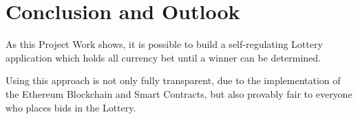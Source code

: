 \chapter{Conclusion and Outlook}\label{chap:conclusion}
\chapterstart

As this Project Work shows, it is possible to build a self-regulating Lottery application which holds all currency bet until a winner can be determined. 

Using this approach is not only fully transparent, due to the implementation of the Ethereum Blockchain and Smart Contracts, but also provably fair to everyone who places bids in the Lottery.

\chapterend
